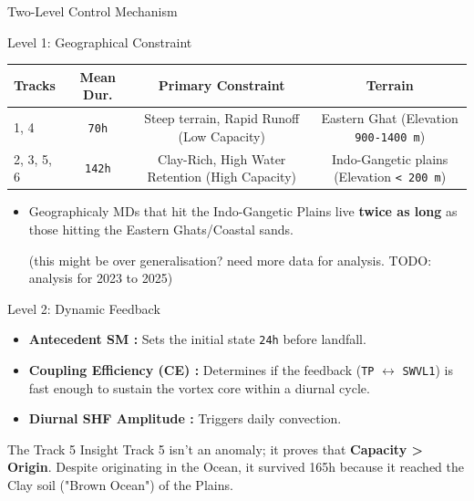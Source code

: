 \documentclass[8pt, aspectratio=169]{beamer}
\begin{document}
\begin{frame}[label=twolevelmechanism]{Two-Level Control Mechanism}
    \footnotesize
    \begin{block}{Level 1: Geographical Constraint}
        \centering
        \begin{tabular}{lccc}
            \toprule
            \textbf{Tracks} & \textbf{Mean Dur.} & \textbf{Primary Constraint} & Terrain \\
            \midrule
            1, 4   & \texttt{70h} & Steep terrain, Rapid Runoff (Low Capacity) & Eastern Ghat (Elevation \texttt{900-1400 m})\\
            2, 3, 5, 6 & \texttt{142h} & Clay-Rich, High Water Retention (High Capacity) & Indo-Gangetic plains (Elevation \texttt{< 200 m}) \\
            \bottomrule
        \end{tabular}

        \vspace{0.2cm}
        \begin{itemize}
            \item Geographicaly MDs that hit the Indo-Gangetic Plains live \textbf{twice as long} as those hitting the Eastern Ghats/Coastal sands. 

                (this might be over generalisation? need more data for analysis. TODO: analysis for 2023 to 2025)
        \end{itemize}
    \end{block}

    \vspace{0.2cm}
    \begin{block}{Level 2: Dynamic Feedback}
        \begin{itemize}
            \item \textbf{Antecedent SM :} Sets the initial state \texttt{24h} before landfall.
            \item \textbf{Coupling Efficiency (CE) :} Determines if the feedback (\texttt{TP} $\leftrightarrow$ \texttt{SWVL1}) is fast enough to sustain the vortex core within a diurnal cycle.
            \item \textbf{Diurnal SHF Amplitude :} Triggers daily convection.
        \end{itemize}
    \end{block}

    \vspace{0.2cm}
    \begin{exampleblock}{The Track 5 Insight}
        Track 5 isn't an anomaly; it proves that \textbf{Capacity > Origin}. Despite originating in the Ocean, it survived 165h because it reached the Clay soil ("Brown Ocean") of the Plains.
    \end{exampleblock}
\end{frame}
\end{document}
